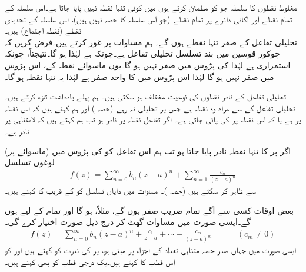 مخلوط نقطوں  کا سلسلہ جو  کو مطمئن کرتے ہوں میں کوئی تنہا نقطہ نہیں پایا جاتا ہے۔اس سلسلہ کے تمام نقطے اور اکائی دائرے پر تمام نقطے (جو اس سلسلہ کا حصہ نہیں ہیں)، اس سلسلہ کے تحدیدی نقطے (نقطہ اجتماع) ہیں۔ 
\quad {}\\
تحلیلی تفاعل  کے صفر تنہا نقطے ہوں گے۔
\quad
ہم مساوات  پر غور کرتے ہیں۔فرض کریں کہ چوکور قوسین میں بند تسلسل  تحلیلی تفاعل  ہے۔چونکہ  ہے لہٰذا  ہو گا۔نتیجتاً، چونکہ  استمراری ہے لہٰذا  کی پڑوس میں  صفر نہیں ہو گا۔یوں ماسوائے نقطہ  کے،   اس پڑوس میں صفر نہیں ہو گا لہٰذا اس پڑوس میں  کا واحد صفر ہے  لہٰذا یہ تنہا نقطہ ہو گا۔

تحلیلی تفاعل کے نادر نقطوں کی نوعیت مختلف ہو سکتی ہیں۔ ہم پہلے یادداشت تازہ کرتے ہیں۔ تحلیلی تفاعل  کے  سے مراد وہ نقطہ ہے جس پر  تحلیلی نہ رہے (حصہ ) اور ہم کہتے ہیں کہ اس نقطہ پر   ہے یا کہ اس نقطہ پر  کی  پائی جاتی ہے۔ اگر تفاعل  نقطہ  پر نادر ہو تب ہم کہتے ہیں کہ  لامتناہی پر نادر ہے۔

اگر  پر  کا تنہا نقطہ نادر پایا جاتا ہو تب ہم اس تفاعل کو  کی پڑوس میں (ماسوائے  پر) لوغوں تسلسل
\begin{align}\label{مساوات_ٹیلر_لوغوں_تنہا_نقطہ_نادر_الف}
f(z)=\sum\limits_{n=0}^{\infty} b_n(z-a)^n+\sum\limits_{n=1}^{\infty} \frac{c_n}{(z-a)^n}
\end{align}
سے ظاہر کر سکتے ہیں (حصہ )۔ مساوات  میں دایاں تسلسل کو  کے قریب  کا  کہتے ہیں۔

بعض اوقات کسی  سے آگے تمام  ضریب   صفر ہوں گے، مثلاً،  ہو گا اور تمام  کے لیے  ہوں گے۔ایسی صورت میں مساوات  گھٹ کر درج ذیل صورت اختیار کرے گی۔
\begin{align}\label{مساوات_ٹیلر_لوغوں_تنہا_نقطہ_نادر_ب}
f(z)=\sum\limits_{n=0}^{\infty} b_n(z-a)^n+\frac{c_1}{z-a}+\cdots+\frac{c_m}{(z-a)^m}\quad \quad\quad (c_m\ne 0)
\end{align}  
ایسی صورت میں جہاں صدر حصہ متناہی تعداد کے اجزاء پر مبنی ہو،  پر  کی ندرت کو  کہتے ہیں اور  کو اس قطب کا  کہتے ہیں۔یک درجی قطب کو  بھی کہتے ہیں۔

